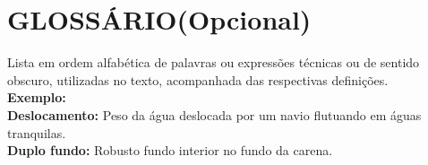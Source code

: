 
\chapter*{GLOSSÁRIO(Opcional)}%


Lista em ordem alfabética de palavras ou expressões técnicas ou de sentido obscuro, utilizadas no texto, acompanhada das respectivas definições.\\

\noindent
\textbf{Exemplo:}\\

\noindent
\textbf{Deslocamento:} Peso da água deslocada por um navio flutuando em águas tranquilas.\\

\noindent
\textbf{Duplo fundo:} Robusto fundo interior no fundo da carena.

